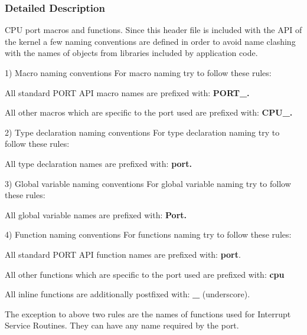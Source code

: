 \subsubsection{Detailed Description}
C\-P\-U port macros and functions. Since this header file is included with the A\-P\-I of the kernel a few naming conventions are defined in order to avoid name clashing with the names of objects from libraries included by application code.

\begin{DoxyParagraph}{1) Macro naming conventions}
For macro naming try to follow these rules\-:
\begin{DoxyItemize}
\item All standard P\-O\-R\-T A\-P\-I macro names are prefixed with\-: {\bfseries {\ttfamily P\-O\-R\-T\-\_\-}.} 
\item All other macros which are specific to the port used are prefixed with\-: {\bfseries {\ttfamily C\-P\-U\-\_\-}.} 
\end{DoxyItemize}
\end{DoxyParagraph}
\begin{DoxyParagraph}{2) Type declaration naming conventions}
For type declaration naming try to follow these rules\-:
\begin{DoxyItemize}
\item All type declaration names are prefixed with\-: {\bfseries {\ttfamily port}.} 
\end{DoxyItemize}
\end{DoxyParagraph}
\begin{DoxyParagraph}{3) Global variable naming conventions}
For global variable naming try to follow these rules\-:
\begin{DoxyItemize}
\item All global variable names are prefixed with\-: {\bfseries {\ttfamily Port}.} 
\end{DoxyItemize}
\end{DoxyParagraph}
\begin{DoxyParagraph}{4) Function naming conventions}
For functions naming try to follow these rules\-:
\begin{DoxyItemize}
\item All standard P\-O\-R\-T A\-P\-I function names are prefixed with\-: {\bfseries {\ttfamily port}}.
\item All other functions which are specific to the port used are prefixed with\-: {\bfseries {\ttfamily cpu}}
\item All inline functions are additionally postfixed with\-: {\bfseries {\ttfamily \-\_\-} }(underscore).
\item The {\ttfamily exception} to above two rules are the names of functions used for Interrupt Service Routines. They can have any name required by the port. 
\end{DoxyItemize}
\end{DoxyParagraph}


